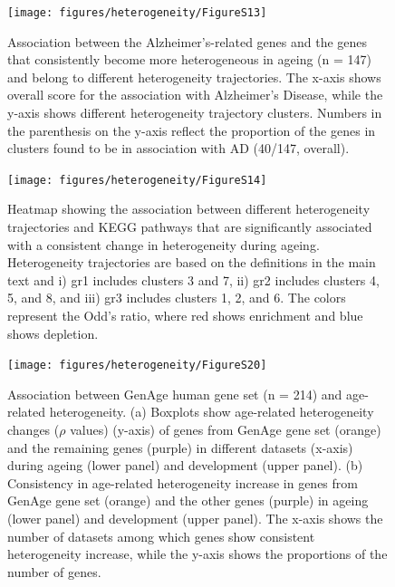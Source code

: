 \documentclass[12pt,twoside]{unicam}
\begin{document}
\begin{figure}

{\centering \texttt{[image: figures/heterogeneity/FigureS13]} 

}

\caption[Association between the Alzheimer's-related genes and the genes that consistently become more heterogeneous in ageing (n = 147) and belong to different heterogeneity trajectories.]{Association between the Alzheimer's-related genes and the genes that consistently become more heterogeneous in ageing (n = 147) and belong to different heterogeneity trajectories. The x-axis shows overall score for the association with Alzheimer's Disease, while the y-axis shows different heterogeneity trajectory clusters. Numbers in the parenthesis on the y-axis reflect the proportion of the genes in clusters found to be in association with AD (40/147, overall).}\label{fig:hetFigS13}
\end{figure}

\begin{figure}

{\centering \texttt{[image: figures/heterogeneity/FigureS14]} 

}

\caption[Association between different heterogeneity trajectories and KEGG pathways that are significantly associated with a consistent change in heterogeneity during ageing.]{Heatmap showing the association between different heterogeneity trajectories and KEGG pathways that are significantly associated with a consistent change in heterogeneity during ageing. Heterogeneity trajectories are based on the definitions in the main text and i) gr1 includes clusters 3 and 7, ii) gr2 includes clusters 4, 5, and 8, and iii) gr3 includes clusters 1, 2, and 6. The colors represent the Odd’s ratio, where red shows enrichment and blue shows depletion.}\label{fig:hetFigS14}
\end{figure}

\begin{figure}

{\centering \texttt{[image: figures/heterogeneity/FigureS20]} 

}

\caption[Association between GenAge human gene set and age-related heterogeneity.]{Association between GenAge human gene set (n = 214) and age-related heterogeneity. (a) Boxplots show age-related heterogeneity changes ($\rho$ values) (y-axis) of genes from GenAge gene set (orange) and the remaining genes (purple) in different datasets (x-axis) during ageing (lower panel) and development (upper panel). (b) Consistency in age-related heterogeneity increase in genes from GenAge gene set (orange) and the other genes (purple) in ageing (lower panel) and development (upper panel). The x-axis shows the number of datasets among which genes show consistent heterogeneity increase, while the y-axis shows the proportions of the number of genes.}\label{fig:hetFigS20}
\end{figure}
\end{document}
